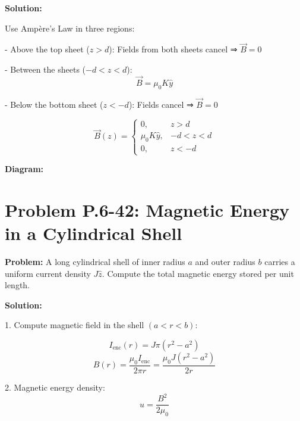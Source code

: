 \documentclass[12pt]{article}
\begin{document}
\textbf{Solution:}

Use Ampère’s Law in three regions:

- Above the top sheet (\( z > d \)):  
  Fields from both sheets cancel ⇒ \( \vec{B} = 0 \)

- Between the sheets (\( -d < z < d \)):  
  \[
  \vec{B} = \mu_0 K \hat{y}
  \]

- Below the bottom sheet (\( z < -d \)):  
  Fields cancel ⇒ \( \vec{B} = 0 \)

\begin{tcolorbox}
\[
\boxed{
\vec{B}(z) =
\begin{cases}
0, & z > d \\
\mu_0 K \hat{y}, & -d < z < d \\
0, & z < -d
\end{cases}
}
\]
\end{tcolorbox}

\textbf{Diagram:}
\begin{center}
\end{center}



\section*{Problem P.6-42: Magnetic Energy in a Cylindrical Shell}

\textbf{Problem:}  
A long cylindrical shell of inner radius \( a \) and outer radius \( b \) carries a uniform current density \( J \hat{z} \). Compute the total magnetic energy stored per unit length.

\textbf{Solution:}

1. Compute magnetic field in the shell \( (a < r < b) \):

\[
I_{\text{enc}}(r) = J \pi (r^2 - a^2)
\]
\[
B(r) = \frac{\mu_0 I_{\text{enc}}}{2\pi r} = \frac{\mu_0 J (r^2 - a^2)}{2r}
\]

2. Magnetic energy density:
\[
u = \frac{B^2}{2\mu_0}
\]
\end{document}
